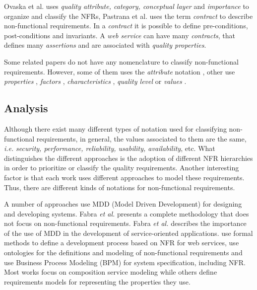Ovaska et al.\cite{OvaskaEHPA10} uses
\textit{quality attribute, category, conceptual layer} and \textit{importance}
to organize and classify the NFRs, Pastrana et al.\cite{PastranaPK11} uses
the term \textit{contract} to describe non-functional requirements. In a
\textit{contract} it is possible to define pre-conditions, post-conditions and
invariants. A \textit{web service} can have many \textit{contracts}, that
defines many \textit{assertions} and are associated with \textit{quality
properties}. 




Some related papers do not have any
nomenclature to classify non-functional requirements. However, some of them uses
the \textit{attribute} notation \cite{ZhangPSP05,BasinDL06,JeongCL09}, other
use \textit{properties} \cite{Fabra2011}, \textit{factors}
\cite{MohantyRP10,GutierrezRF10}, \textit{characteristics}
\cite{DiamadopoulouMPS08}, \textit{quality level} \cite{ModicaTV09} or
\textit{values} \cite{ThissenW06,BasinDL06}.



\subsection{Analysis}
\label{sec:proposal}


Although there exist many different types of notation used for classifying
non-functional requirements, in general, the values associated to them are the
same, \textit{i.e.} \textit{security, performance, reliability, usability, availability}, etc. What
distinguishes the different approaches is the adoption of different NFR
hierarchies in order to prioritize or classify the quality requirements. Another interesting factor
is that each work uses different approaches to model these requirements.
Thus, there are different kinds of notations for non-functional
requirements.
 
A number of approaches use
\cite{DAmbrogio06,CholletL09,SchmelingCM11,BasinDL06,Fabra2011,OvaskaEHPA10} MDD
(Model Driven Development) for designing and developing systems. Fabra
\textit{et al.} \cite{Fabra2011} presents a complete methodology that does not
focus on non-functional requirements. Fabra \textit{et al.} \cite{Fabra2011}
describes the importance of the use of MDD in the development of service-oriented applications. \cite{ThissenW06,ZhangPSP05} use formal methods to define a development process based on NFR for web services,
\cite{AgarwalLS09,PastranaPK11} use ontologies for the definitions and
modeling of non-functional requirements and \cite{XiaoCZBOLH08,GutierrezRF10} use Business Process Modeling (BPM) for
system specification, including NFR. Most works focus on composition
service modeling while others define requirements models for representing the
properties they use.

